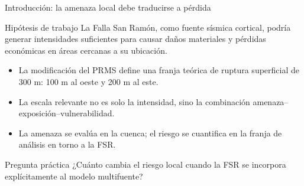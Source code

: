 \documentclass[aspectratio=169,10pt]{beamer}
\newcommand{\tightlist}{\setlength{\itemsep}{0.28em}}
\begin{document}
\begin{frame}[t]{Introducción: la amenaza local debe traducirse a pérdida}
\begin{block}{Hipótesis de trabajo}
La Falla San Ramón, como fuente sísmica cortical, podría generar intensidades suficientes para causar daños materiales y pérdidas económicas en áreas cercanas a su ubicación.
\end{block}
\vspace{0.25em}
\begin{itemize}\tightlist
  \item La modificación del PRMS define una franja teórica de ruptura superficial de 300 m: 100 m al oeste y 200 m al este.
  \item La escala relevante no es solo la intensidad, sino la combinación amenaza--exposición--vulnerabilidad.
  \item La amenaza se evalúa en la cuenca; el riesgo se cuantifica en la franja de análisis en torno a la FSR.
\end{itemize}
\begin{block}{Pregunta práctica}
¿Cuánto cambia el riesgo local cuando la FSR se incorpora explícitamente al modelo multifuente?
\end{block}
\end{frame}
\end{document}

